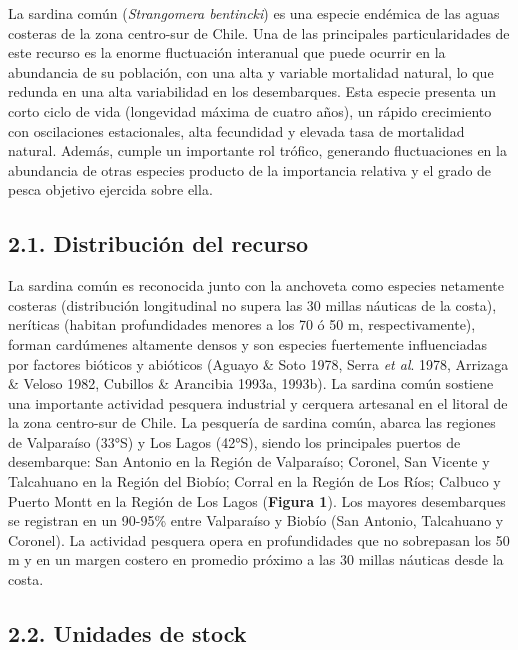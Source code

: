 \documentclass[
  spanish,
]{article}
\begin{document}
La sardina común (\emph{Strangomera bentincki}) es una especie endémica
de las aguas costeras de la zona centro-sur de Chile. Una de las
principales particularidades de este recurso es la enorme fluctuación
interanual que puede ocurrir en la abundancia de su población, con una
alta y variable mortalidad natural, lo que redunda en una alta
variabilidad en los desembarques. Esta especie presenta un corto ciclo
de vida (longevidad máxima de cuatro años), un rápido crecimiento con
oscilaciones estacionales, alta fecundidad y elevada tasa de mortalidad
natural. Además, cumple un importante rol trófico, generando
fluctuaciones en la abundancia de otras especies producto de la
importancia relativa y el grado de pesca objetivo ejercida sobre ella.

\hypertarget{distribuciuxf3n-del-recurso}{%
\subsection{2.1. Distribución del
recurso}\label{distribuciuxf3n-del-recurso}}

La sardina común es reconocida junto con la anchoveta como especies
netamente costeras (distribución longitudinal no supera las 30 millas
náuticas de la costa), neríticas (habitan profundidades menores a los 70
ó 50 m, respectivamente), forman cardúmenes altamente densos y son
especies fuertemente influenciadas por factores bióticos y abióticos
(Aguayo \& Soto 1978, Serra \emph{et al}. 1978, Arrizaga \& Veloso 1982,
Cubillos \& Arancibia 1993a, 1993b). La sardina común sostiene una
importante actividad pesquera industrial y cerquera artesanal en el
litoral de la zona centro-sur de Chile. La pesquería de sardina común,
abarca las regiones de Valparaíso (33°S) y Los Lagos (42°S), siendo los
principales puertos de desembarque: San Antonio en la Región de
Valparaíso; Coronel, San Vicente y Talcahuano en la Región del Biobío;
Corral en la Región de Los Ríos; Calbuco y Puerto Montt en la Región de
Los Lagos (\textbf{Figura 1}). Los mayores desembarques se registran en
un 90-95\% entre Valparaíso y Biobío (San Antonio, Talcahuano y
Coronel). La actividad pesquera opera en profundidades que no sobrepasan
los 50 m y en un margen costero en promedio próximo a las 30 millas
náuticas desde la costa.

\hypertarget{unidades-de-stock}{%
\subsection{2.2. Unidades de stock}\label{unidades-de-stock}}
\end{document}
